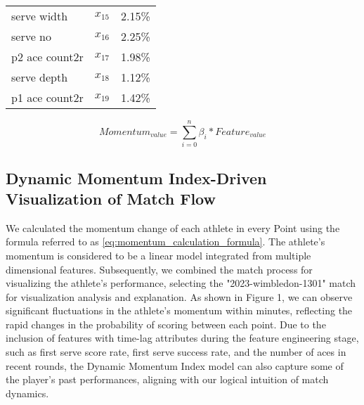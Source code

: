 \documentclass{mcmthesis}
\begin{document}
\begin{table}[h!]
\begin{tabular}{lcc}
        serve width                     & \(x_{15}\)               & 2.15\%             \\
        serve no                        & \(x_{16}\)               & 2.25\%             \\
        p2 ace count2r                  & \(x_{17}\)               & 1.98\%             \\
        serve depth                     & \(x_{18}\)               & 1.12\%             \\
        p1 ace count2r                  & \(x_{19}\)               & 1.42\%             \\
        \hline
    \end{tabular}
    \label{table:updated_multi_model_feature_importance_analysis}
\end{table}
\begin{equation} \label{eq:momentum_calculation_formula}
    Momentum_{value} = \sum_{i=0}^n{\beta_{i} * Feature_{value}}
\end{equation}

\subsection{Dynamic Momentum Index-Driven Visualization of Match Flow}
We calculated the momentum change of each athlete in every Point using the formula referred to as \ref{eq:momentum_calculation_formula}. The athlete's momentum is considered to be a linear model integrated from multiple dimensional features. Subsequently, we combined the match process for visualizing the athlete's performance, selecting the "2023-wimbledon-1301" match for visualization analysis and explanation. As shown in Figure 1, we can observe significant fluctuations in the athlete's momentum within minutes, reflecting the rapid changes in the probability of scoring between each point. Due to the inclusion of features with time-lag attributes during the feature engineering stage, such as first serve score rate, first serve success rate, and the number of aces in recent rounds, the Dynamic Momentum Index model can also capture some of the player's past performances, aligning with our logical intuition of match dynamics.
\end{document}
